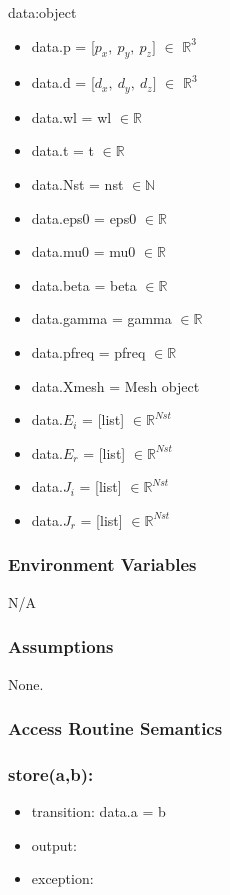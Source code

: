 \documentclass[12pt, titlepage]{article}
\begin{document}
data:object 
\begin{itemize}
	\item data.p = [$p_x,\ p_y,\ p_z]$ $\in$ $\mathbb{R}^3$
	\item data.d = [$d_x,\ d_y,\ d_z]$ $\in$ $\mathbb{R}^3$
	\item data.wl = wl $\in \mathbb{R}$
	\item data.t = t $\in \mathbb{R}$	
	\item data.Nst = nst $\in \mathbb{N}$
	\item data.eps0 = eps0 $\in \mathbb{R}$
	\item data.mu0 = mu0 $\in \mathbb{R}$
	\item data.beta = beta $\in \mathbb{R}$
	\item data.gamma = gamma $\in \mathbb{R}$
	\item data.pfreq = pfreq $\in \mathbb{R}$
	\item data.Xmesh = Mesh object
	\item data.$E_i$ = [list] $\in \mathbb{R}^{Nst}$ 
	\item data.$E_r$ = [list] $\in \mathbb{R}^{Nst}$ 
	\item data.$J_i$ = [list] $\in \mathbb{R}^{Nst}$ 
	\item data.$J_r$ = [list] $\in \mathbb{R}^{Nst}$ 
	
\end{itemize}

\subsubsection{Environment Variables}

N/A
\subsubsection{Assumptions}

None.

\subsubsection{Access Routine Semantics}

\subsubsection*{store(a,b):}
\begin{itemize}
\item transition: data.a = b 
\item output: 
\item exception:  
\end{itemize}
\end{document}
